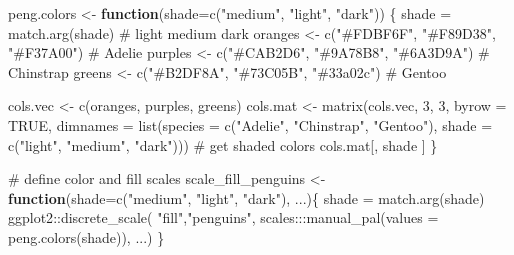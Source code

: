 \documentclass[
  letterpaper,
  10pt,
  krantz2]{krantz}
\makeatletter
\newenvironment{Shaded}{\begin{snugshade}}{\end{snugshade}}
\newcommand{\AttributeTok}[1]{\textcolor[rgb]{0.40,0.45,0.13}{#1}}
\newcommand{\CommentTok}[1]{\textcolor[rgb]{0.37,0.37,0.37}{#1}}
\newcommand{\ConstantTok}[1]{\textcolor[rgb]{0.56,0.35,0.01}{#1}}
\newcommand{\ControlFlowTok}[1]{\textcolor[rgb]{0.00,0.23,0.31}{\textbf{#1}}}
\newcommand{\DecValTok}[1]{\textcolor[rgb]{0.68,0.00,0.00}{#1}}
\newcommand{\FunctionTok}[1]{\textcolor[rgb]{0.28,0.35,0.67}{#1}}
\newcommand{\NormalTok}[1]{\textcolor[rgb]{0.00,0.23,0.31}{#1}}
\newcommand{\OtherTok}[1]{\textcolor[rgb]{0.00,0.23,0.31}{#1}}
\newcommand{\SpecialCharTok}[1]{\textcolor[rgb]{0.37,0.37,0.37}{#1}}
\newcommand{\StringTok}[1]{\textcolor[rgb]{0.13,0.47,0.30}{#1}}
\newenvironment{kframe}{%
  \medskip{}
  \setlength{\fboxsep}{.8em}
  \def\at@end@of@kframe{}%
  \ifinner\ifhmode%
  \def\at@end@of@kframe{\end{minipage}}%
  \begin{minipage}{\columnwidth}%
  \fi\fi%
  \def\FrameCommand##1{\hskip\@totalleftmargin \hskip-\fboxsep
  \colorbox{shadecolor}{##1}\hskip-\fboxsep
      \hskip-\linewidth \hskip-\@totalleftmargin \hskip\columnwidth}%
  \MakeFramed {\advance\hsize-\width
    \@totalleftmargin\z@ \linewidth\hsize
    \@setminipage}}%
{\par\unskip\endMakeFramed%
  \at@end@of@kframe}
\renewenvironment{Shaded}{\begin{kframe}}{\end{kframe}}
\makeatother
\begin{document}
\begin{Shaded}
\begin{Highlighting}[]
\NormalTok{peng.colors }\OtherTok{\textless{}{-}} \ControlFlowTok{function}\NormalTok{(}\AttributeTok{shade=}\FunctionTok{c}\NormalTok{(}\StringTok{"medium"}\NormalTok{, }\StringTok{"light"}\NormalTok{, }\StringTok{"dark"}\NormalTok{)) \{}
\NormalTok{  shade }\OtherTok{=} \FunctionTok{match.arg}\NormalTok{(shade)}
  \CommentTok{\#             light      medium     dark}
\NormalTok{  oranges }\OtherTok{\textless{}{-}} \FunctionTok{c}\NormalTok{(}\StringTok{"\#FDBF6F"}\NormalTok{, }\StringTok{"\#F89D38"}\NormalTok{, }\StringTok{"\#F37A00"}\NormalTok{)  }\CommentTok{\# Adelie}
\NormalTok{  purples }\OtherTok{\textless{}{-}} \FunctionTok{c}\NormalTok{(}\StringTok{"\#CAB2D6"}\NormalTok{, }\StringTok{"\#9A78B8"}\NormalTok{, }\StringTok{"\#6A3D9A"}\NormalTok{)  }\CommentTok{\# Chinstrap}
\NormalTok{  greens }\OtherTok{\textless{}{-}}  \FunctionTok{c}\NormalTok{(}\StringTok{"\#B2DF8A"}\NormalTok{, }\StringTok{"\#73C05B"}\NormalTok{, }\StringTok{"\#33a02c"}\NormalTok{)  }\CommentTok{\# Gentoo}
  
\NormalTok{  cols.vec }\OtherTok{\textless{}{-}} \FunctionTok{c}\NormalTok{(oranges, purples, greens)}
\NormalTok{  cols.mat }\OtherTok{\textless{}{-}} 
    \FunctionTok{matrix}\NormalTok{(cols.vec, }\DecValTok{3}\NormalTok{, }\DecValTok{3}\NormalTok{, }
           \AttributeTok{byrow =} \ConstantTok{TRUE}\NormalTok{,}
           \AttributeTok{dimnames =} \FunctionTok{list}\NormalTok{(}\AttributeTok{species =} \FunctionTok{c}\NormalTok{(}\StringTok{"Adelie"}\NormalTok{, }\StringTok{"Chinstrap"}\NormalTok{, }\StringTok{"Gentoo"}\NormalTok{),}
                           \AttributeTok{shade =} \FunctionTok{c}\NormalTok{(}\StringTok{"light"}\NormalTok{, }\StringTok{"medium"}\NormalTok{, }\StringTok{"dark"}\NormalTok{)))}
  \CommentTok{\# get shaded colors}
\NormalTok{  cols.mat[, shade ]}
\NormalTok{\}}

\CommentTok{\# define color and fill scales}
\NormalTok{scale\_fill\_penguins }\OtherTok{\textless{}{-}} \ControlFlowTok{function}\NormalTok{(}\AttributeTok{shade=}\FunctionTok{c}\NormalTok{(}\StringTok{"medium"}\NormalTok{, }\StringTok{"light"}\NormalTok{, }\StringTok{"dark"}\NormalTok{), ...)\{}
\NormalTok{  shade }\OtherTok{=} \FunctionTok{match.arg}\NormalTok{(shade)}
\NormalTok{  ggplot2}\SpecialCharTok{::}\FunctionTok{discrete\_scale}\NormalTok{(}
    \StringTok{"fill"}\NormalTok{,}\StringTok{"penguins"}\NormalTok{,}
\NormalTok{     scales}\SpecialCharTok{:::}\FunctionTok{manual\_pal}\NormalTok{(}\AttributeTok{values =} \FunctionTok{peng.colors}\NormalTok{(shade)), ...)}
\NormalTok{\}}


\end{Highlighting}
\end{Shaded}
\end{document}
